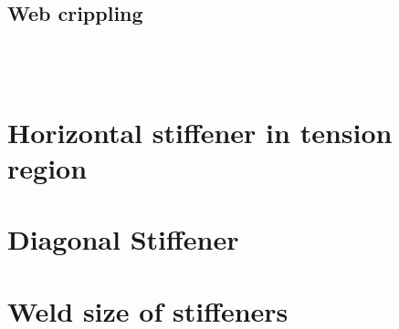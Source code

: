\documentclass[11.5pt,a4paper,oneside]{report}
\begin{document}
\begin{Form}
\subsection{Web crippling}
\qquad {} \\ \\




\section{Horizontal stiffener in tension region}

\section{Diagonal Stiffener}

\section{Weld size of stiffeners}
\end{Form}
\end{document}
